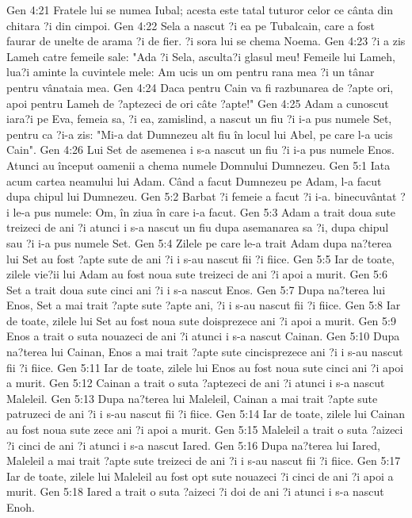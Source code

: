 Gen 4:21  Fratele lui se numea Iubal; acesta este tatal tuturor celor ce cânta din chitara ?i din cimpoi.
Gen 4:22  Sela a nascut ?i ea pe Tubalcain, care a fost faurar de unelte de arama ?i de fier. ?i sora lui se chema Noema.
Gen 4:23  ?i a zis Lameh catre femeile sale: "Ada ?i Sela, asculta?i glasul meu! Femeile lui Lameh, lua?i aminte la cuvintele mele: Am ucis un om pentru rana mea ?i un tânar pentru vânataia mea.
Gen 4:24  Daca pentru Cain va fi razbunarea de ?apte ori, apoi pentru Lameh de ?aptezeci de ori câte ?apte!"
Gen 4:25  Adam a cunoscut iara?i pe Eva, femeia sa, ?i ea, zamislind, a nascut un fiu ?i i-a pus numele Set, pentru ca ?i-a zis: "Mi-a dat Dumnezeu alt fiu în locul lui Abel, pe care l-a ucis Cain".
Gen 4:26  Lui Set de asemenea i s-a nascut un fiu ?i i-a pus numele Enos. Atunci au început oamenii a chema numele Domnului Dumnezeu.
Gen 5:1  Iata acum cartea neamului lui Adam. Când a facut Dumnezeu pe Adam, l-a facut dupa chipul lui Dumnezeu.
Gen 5:2  Barbat ?i femeie a facut ?i i-a. binecuvântat ?i le-a pus numele: Om, în ziua în care i-a facut.
Gen 5:3  Adam a trait doua sute treizeci de ani ?i atunci i s-a nascut un fiu dupa asemanarea sa ?i, dupa chipul sau ?i i-a pus numele Set.
Gen 5:4  Zilele pe care le-a trait Adam dupa na?terea lui Set au fost ?apte sute de ani ?i i s-au nascut fii ?i fiice.
Gen 5:5  Iar de toate, zilele vie?ii lui Adam au fost noua sute treizeci de ani ?i apoi a murit.
Gen 5:6  Set a trait doua sute cinci ani ?i i s-a nascut Enos.
Gen 5:7  Dupa na?terea lui Enos, Set a mai trait ?apte sute ?apte ani, ?i i s-au nascut fii ?i fiice.
Gen 5:8  Iar de toate, zilele lui Set au fost noua sute doisprezece ani ?i apoi a murit.
Gen 5:9  Enos a trait o suta nouazeci de ani ?i atunci i s-a nascut Cainan.
Gen 5:10  Dupa na?terea lui Cainan, Enos a mai trait ?apte sute cincisprezece ani ?i i s-au nascut fii ?i fiice.
Gen 5:11  Iar de toate, zilele lui Enos au fost noua sute cinci ani ?i apoi a murit.
Gen 5:12  Cainan a trait o suta ?aptezeci de ani ?i atunci i s-a nascut Maleleil.
Gen 5:13  Dupa na?terea lui Maleleil, Cainan a mai trait ?apte sute patruzeci de ani ?i i s-au nascut fii ?i fiice.
Gen 5:14  Iar de toate, zilele lui Cainan au fost noua sute zece ani ?i apoi a murit.
Gen 5:15  Maleleil a trait o suta ?aizeci ?i cinci de ani ?i atunci i s-a nascut Iared.
Gen 5:16  Dupa na?terea lui Iared, Maleleil a mai trait ?apte sute treizeci de ani ?i i s-au nascut fii ?i fiice.
Gen 5:17  Iar de toate, zilele lui Maleleil au fost opt sute nouazeci ?i cinci de ani ?i apoi a murit.
Gen 5:18  Iared a trait o suta ?aizeci ?i doi de ani ?i atunci i s-a nascut Enoh.
